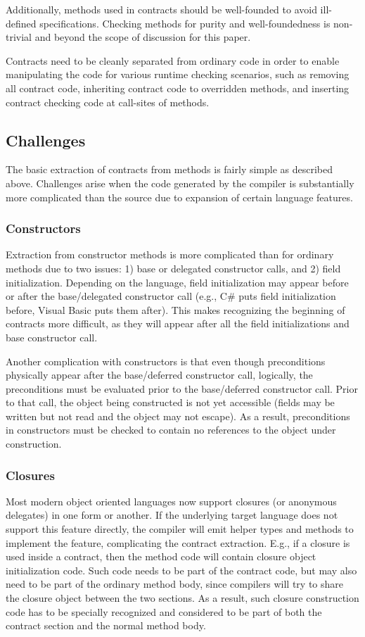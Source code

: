 \documentclass{sig-alternate}
\newcommand{\csharp}{C\#}
\begin{document}
\begin{itemize}
  Additionally, methods used in contracts should be well-founded to
  avoid ill-defined specifications. 
  Checking methods for purity and well-foundedness is non-trivial and
  beyond the scope of discussion for this paper.
\end{itemize}
Contracts need to be cleanly separated from ordinary code in order to
enable manipulating the code for various runtime checking
scenarios, such as removing all contract code, inheriting contract
code to overridden methods, and inserting contract checking code at
call-sites of methods.

\subsection{Challenges}
\noindent
The basic extraction of contracts from methods is fairly simple as
described above. Challenges arise when the code generated by the
compiler is substantially more complicated than the source due to
expansion of certain language features. 

\subsubsection{Constructors}
\noindent
Extraction from constructor methods is more complicated than for
ordinary methods due to two issues: 1) base or delegated constructor calls, and 2)
field initialization. Depending on the language, field initialization
may appear before or after the base/delegated constructor call (e.g.,
\csharp{} puts field initialization before, Visual Basic puts them
after). This makes recognizing the beginning of contracts more
difficult, as they will appear after all the field initializations and
base constructor call.

Another complication with constructors is that even though
preconditions physically appear after the base/deferred constructor call,
logically, the preconditions must be evaluated prior to the base/deferred
constructor call. Prior to that call, the object being constructed is
not yet accessible (fields may be written but not read and the object may
not escape). As a result, preconditions in constructors must be
checked to contain no references to the object under construction.

\subsubsection{Closures}
\noindent
Most modern object oriented languages now support closures (or
anonymous delegates) in one form or another. If the underlying target
language does not support this feature directly, the compiler will
emit helper types and methods to implement the feature, complicating
the contract extraction. E.g., if a closure is used inside a contract,
then the method code will contain closure object initialization
code. Such code needs to be part of the contract code, but may also
need to be part of the ordinary method body, since compilers will try
to share the closure object between the two sections. As a result,
such closure construction code has to be specially recognized and
considered to be part of both the contract section and the normal
method body.
\end{document}
